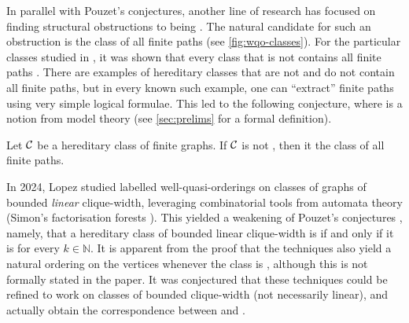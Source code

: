 \AP In parallel with Pouzet's conjectures, another line of research has
focused on finding structural obstructions to being
. The natural candidate for such an
obstruction is the class of all finite paths (see \cref{fig:wqo-classes}). For the
particular classes studied in \cite{DRT10}, it was shown that every class that
is not  contains all finite paths \cite[Corollary
2]{DRT10}. There are examples of hereditary classes that are not
 and do not contain all finite paths, but in every
known such example, one can ``extract'' finite paths using very simple logical
formulae. This led to the following conjecture, where 
 is a notion from model theory
(see \cref{sec:prelims} for a formal definition).

\begin{conjecture}
    \label{conj:path-transduction}
    Let $\Cls$ be a hereditary class of finite graphs.
    If $\Cls$ is not ,
    then it  the class of all finite paths.
\end{conjecture}




\AP In 2024, Lopez \cite{LOPEZ24} studied labelled well-quasi-orderings on
classes of graphs of bounded \emph{linear} clique-width, leveraging
combinatorial tools from automata theory (Simon's factorisation forests
\cite{SIMO90}). This yielded a weakening of Pouzet's conjectures
\cite[Corollary 2]{LOPEZ24}, namely, that a hereditary class of bounded linear
clique-width is  if and only if it is
 for every $k \in \mathbb{N}$. It is apparent from
the proof that the techniques also yield a natural ordering on the vertices
whenever the class is , although this is not
formally stated in the paper. It was conjectured \cite[Section 5]{LOPEZ24} that
these techniques could be refined to work on classes of bounded clique-width
(not necessarily linear), and actually obtain the correspondence between
 and .


